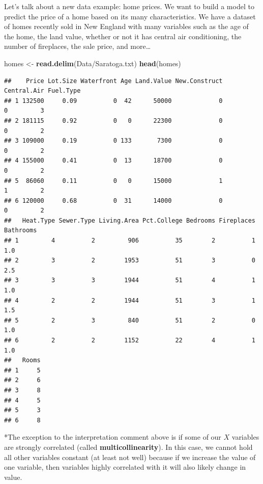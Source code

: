 \documentclass[
]{book}
\newenvironment{Shaded}{\begin{snugshade}}{\end{snugshade}}
\newcommand{\FunctionTok}[1]{\textcolor[rgb]{0.13,0.29,0.53}{\textbf{#1}}}
\newcommand{\NormalTok}[1]{#1}
\newcommand{\OtherTok}[1]{\textcolor[rgb]{0.56,0.35,0.01}{#1}}
\newcommand{\StringTok}[1]{\textcolor[rgb]{0.31,0.60,0.02}{#1}}
\begin{document}
Let's talk about a new data example: home prices. We want to build a model to predict the price of a home based on its many characteristics. We have a dataset of homes recently sold in New England with many variables such as the age of the home, the land value, whether or not it has central air conditioning, the number of fireplaces, the sale price, and more\ldots{}

\begin{Shaded}
\begin{Highlighting}[]
\NormalTok{homes }\OtherTok{\textless{}{-}} \FunctionTok{read.delim}\NormalTok{(}\StringTok{\textquotesingle{}Data/Saratoga.txt\textquotesingle{}}\NormalTok{)}
\FunctionTok{head}\NormalTok{(homes)}
\end{Highlighting}
\end{Shaded}

\begin{verbatim}
##    Price Lot.Size Waterfront Age Land.Value New.Construct Central.Air Fuel.Type
## 1 132500     0.09          0  42      50000             0           0         3
## 2 181115     0.92          0   0      22300             0           0         2
## 3 109000     0.19          0 133       7300             0           0         2
## 4 155000     0.41          0  13      18700             0           0         2
## 5  86060     0.11          0   0      15000             1           1         2
## 6 120000     0.68          0  31      14000             0           0         2
##   Heat.Type Sewer.Type Living.Area Pct.College Bedrooms Fireplaces Bathrooms
## 1         4          2         906          35        2          1       1.0
## 2         3          2        1953          51        3          0       2.5
## 3         3          3        1944          51        4          1       1.0
## 4         2          2        1944          51        3          1       1.5
## 5         2          3         840          51        2          0       1.0
## 6         2          2        1152          22        4          1       1.0
##   Rooms
## 1     5
## 2     6
## 3     8
## 4     5
## 5     3
## 6     8
\end{verbatim}

*The exception to the interpretation comment above is if some of our \(X\) variables are strongly correlated (called \textbf{multicollinearity}). In this case, we cannot hold all other variables constant (at least not well) because if we increase the value of one variable, then variables highly correlated with it will also likely change in value.
\end{document}
